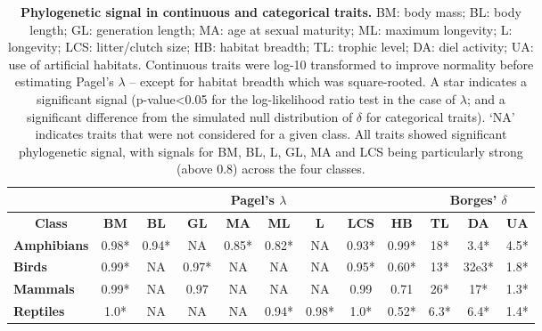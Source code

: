 \begin{table}[h!]
\renewcommand{\baselinestretch}{1}
\renewcommand{\arraystretch}{1.2}
\begin{center}\fontsize{9}{11}\selectfont
\caption[Phylogenetic signal in continuous and categorical traits]{\textbf{Phylogenetic signal in continuous and categorical traits.} BM: body mass; BL: body length; GL: generation length; MA: age at sexual maturity; ML: maximum longevity; L: longevity; LCS: litter/clutch size; HB: habitat breadth; TL: trophic level; DA: diel activity; UA: use of artificial habitats. Continuous traits were log-10 transformed to improve normality before estimating Pagel’s $\lambda$ – except for habitat breadth which was square-rooted. A star indicates a significant signal (p-value<0.05 for the log-likelihood ratio test in the case of $\lambda$; and a significant difference from the simulated null distribution of $\delta$ for categorical traits). ‘NA’ indicates traits that were not considered for a given class. All traits showed significant phylogenetic signal, with signals for BM, BL, L, GL, MA and LCS being particularly strong (above 0.8) across the four classes. }
\label{}  
\begin{tabular}{l|c|c|c|c|c|c|c|c|c|c|c|}
\cline{2-12}
                                          & \multicolumn{8}{c|}{\textbf{Pagel's $\lambda$}}                                                                       & \multicolumn{3}{c|}{\textbf{Borges' $\delta$}} \\ \hline
\multicolumn{1}{|c|}{\textbf{Class}}      & \textbf{BM} & \textbf{BL} & \textbf{GL} & \textbf{MA} & \textbf{ML} & \textbf{L} & \textbf{LCS} & \textbf{HB} & \textbf{TL} & \textbf{DA} & \textbf{UA} \\ \hline
\multicolumn{1}{|l|}{\textbf{Amphibians}} & 0.98*       & 0.94*       & NA          & 0.85*       & 0.82*       & NA         & 0.93*        & 0.99*       & 18*         & 3.4*        & 4.5*        \\ %
\multicolumn{1}{|l|}{\textbf{Birds}}      & 0.99*       & NA          & 0.97*       & NA          & NA          & NA         & 0.95*        & 0.60*       & 13*         & 32e3*       & 1.8*        \\ %
\multicolumn{1}{|l|}{\textbf{Mammals}}    & 0.99*       & NA          & 0.97        & NA          & NA          & NA         & 0.99         & 0.71        & 26*         & 17*         & 1.3*        \\ %
\multicolumn{1}{|l|}{\textbf{Reptiles}}   & 1.0*        & NA          & NA          & NA          & 0.94*       & 0.98*      & 1.0*         & 0.52*       & 6.3*        & 6.4*        & 1.4*        \\ \hline
\end{tabular}
\end{center}
\end{table}


